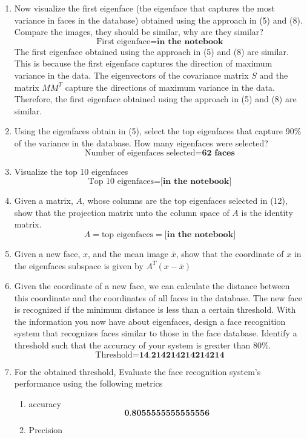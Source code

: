 \documentclass[12pt]{extarticle} %
\begin{document}
\begin{enumerate}
    \item Now visualize the first eigenface (the eigenface that captures the most variance in faces in the database) obtained using the approach in (5) and (8). Compare the images, they should be similar, why are they similar?
    \[
    \text{First eigenface} = \textbf{in the notebook}
    \]
    The first eigenface obtained using the approach in (5) and (8) are similar. This is because the first eigenface captures the direction of maximum variance in the data. The eigenvectors of the covariance matrix \(S\) and the matrix \(MM^T\) capture the directions of maximum variance in the data. Therefore, the first eigenface obtained using the approach in (5) and (8) are similar.
    \item Using the eigenfaces obtain in (5), select the top eigenfaces that capture 90\% of the variance in the database. How many eigenfaces were selected?
    \[
    \text{Number of eigenfaces selected} = \textbf{62 faces}
    \]
    \item Visualize the top 10 eigenfaces
    \[
    \text{Top 10 eigenfaces} = \textbf{[in the notebook]}
    \]
    \item  Given a matrix, \(A\), whose columns are the top eigenfaces selected in (12), show that the projection matrix unto the column space of \(A\) is the identity matrix.
    \[
    A = \text{top eigenfaces} = \textbf{[in the notebook]}
    \]
    \item Given a new face, \(x\), and the mean image \(\bar{x}\), show that the coordinate of \(x\) in the eigenfaces subspace is given by \(A^T(x-\bar{x})\)
    \item Given the coordinate of a new face, we can calculate the distance between this coordinate and the
    coordinates of all faces in the database. The new face is recognized if the minimum distance is less
    than a certain threshold. With the information you now have about eigenfaces, design a face
    recognition system that recognizes faces similar to those in the face database. Identify a
    threshold such that the accuracy of your system is greater than 80\%.
    \[
    \text{Threshold} = \textbf{14.214214214214214}
    \]
    \item For the obtained threshold, Evaluate the face recognition system’s performance using the following
    metrics
    \begin{enumerate}
        \item accuracy
        \[
            \textbf{0.8055555555555556}
        \]
        \item Precision

\end{enumerate}
\end{enumerate}
\end{document}
